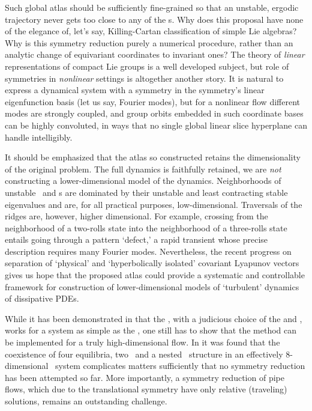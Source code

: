 Such global atlas should be sufficiently fine-grained so that an unstable,
ergodic trajectory never gets too close to any of the {\sset s}.
Why does this proposal have none of the elegance of, let's say,
Killing-Cartan classification of simple Lie algebras?
Why is this symmetry reduction purely a numerical procedure, rather
than an analytic change of equivariant coordinates to invariant ones?
The theory of \emph{linear} representations of compact Lie groups is a well
developed subject,
but role of symmetries in \emph{nonlinear} settings is
altogether another story. It is natural to express a dynamical system
with a symmetry in the symmetry's linear eigenfunction basis (let  us say,
Fourier modes), but for a nonlinear flow different modes are strongly coupled,
and group orbits embedded in such coordinate bases can be highly convoluted,
in ways that no single global linear slice hyperplane can handle intelligibly.

It should be emphasized that the atlas so constructed retains the dimensionality of
the original problem. The full dynamics is faithfully retained, we are \emph{not}
constructing a lower-dimensional model of the dynamics. Neighborhoods of
unstable \eqva\ and \po s are dominated by their unstable and least
contracting stable eigenvalues and are, for all practical purposes,
low-dimensional. Traversals of the ridges are, however, higher
dimensional. For example, crossing from the neighborhood of a two-rolls
state into the neighborhood of a three-rolls state entails going through
a pattern `defect,' a rapid transient whose precise description requires
many Fourier modes. Nevertheless,
the recent progress on separation of `physical' and `hyperbolically
isolated' covariant Lyapunov
vectors gives us
hope that the proposed atlas could provide a systematic and controllable
framework for construction of lower-dimensional models of `turbulent'
dynamics of dissipative PDEs.

While it has been demonstrated in   that the \mslices,
with a judicious choice of the {\template} and {\PoincSec}, works for a
system as simple as the \cLf, one still has to show that the method can
be implemented for a truly high-dimensional flow. In  it
was found that the coexistence of four equilibria, two \reqva\ and a
nested \fixedsp\ structure in an effectively $8$-dimensional \KS\ system
complicates matters sufficiently that no symmetry reduction has been
attempted so far. More importantly, a symmetry reduction of pipe flows, which
due to the translational symmetry have only relative (traveling)
solutions, remains an outstanding challenge.
